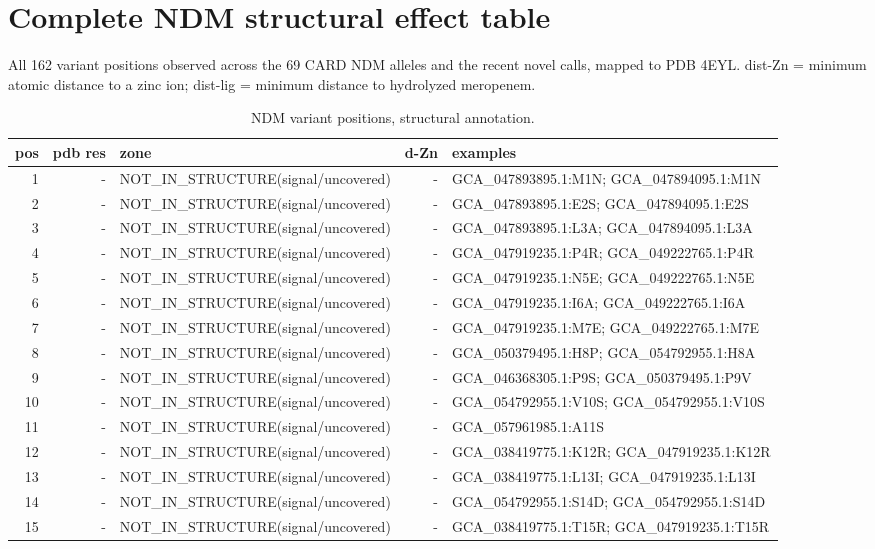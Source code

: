 \section{Complete NDM structural effect table}
All 162 variant positions observed across the 69 CARD NDM alleles and the recent novel calls, mapped to PDB 4EYL. dist-Zn = minimum atomic distance to a zinc ion; dist-lig = minimum distance to hydrolyzed meropenem.
\begin{longtable}{rrlrl}
\caption{NDM variant positions, structural annotation.}\label{tab:ndmfull}\\
\textbf{pos}&\textbf{pdb res}&\textbf{zone}&\textbf{d-Zn}&\textbf{examples}\\\hline
\endhead
1&-&NOT\_IN\_STRUCTURE(signal/uncovered)&-&GCA\_047893895.1:M1N; GCA\_047894095.1:M1N\\
2&-&NOT\_IN\_STRUCTURE(signal/uncovered)&-&GCA\_047893895.1:E2S; GCA\_047894095.1:E2S\\
3&-&NOT\_IN\_STRUCTURE(signal/uncovered)&-&GCA\_047893895.1:L3A; GCA\_047894095.1:L3A\\
4&-&NOT\_IN\_STRUCTURE(signal/uncovered)&-&GCA\_047919235.1:P4R; GCA\_049222765.1:P4R\\
5&-&NOT\_IN\_STRUCTURE(signal/uncovered)&-&GCA\_047919235.1:N5E; GCA\_049222765.1:N5E\\
6&-&NOT\_IN\_STRUCTURE(signal/uncovered)&-&GCA\_047919235.1:I6A; GCA\_049222765.1:I6A\\
7&-&NOT\_IN\_STRUCTURE(signal/uncovered)&-&GCA\_047919235.1:M7E; GCA\_049222765.1:M7E\\
8&-&NOT\_IN\_STRUCTURE(signal/uncovered)&-&GCA\_050379495.1:H8P; GCA\_054792955.1:H8A\\
9&-&NOT\_IN\_STRUCTURE(signal/uncovered)&-&GCA\_046368305.1:P9S; GCA\_050379495.1:P9V\\
10&-&NOT\_IN\_STRUCTURE(signal/uncovered)&-&GCA\_054792955.1:V10S; GCA\_054792955.1:V10S\\
11&-&NOT\_IN\_STRUCTURE(signal/uncovered)&-&GCA\_057961985.1:A11S\\
12&-&NOT\_IN\_STRUCTURE(signal/uncovered)&-&GCA\_038419775.1:K12R; GCA\_047919235.1:K12R\\
13&-&NOT\_IN\_STRUCTURE(signal/uncovered)&-&GCA\_038419775.1:L13I; GCA\_047919235.1:L13I\\
14&-&NOT\_IN\_STRUCTURE(signal/uncovered)&-&GCA\_054792955.1:S14D; GCA\_054792955.1:S14D\\
15&-&NOT\_IN\_STRUCTURE(signal/uncovered)&-&GCA\_038419775.1:T15R; GCA\_047919235.1:T15R\\

\end{longtable}
